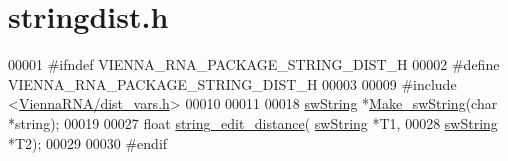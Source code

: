 \hypertarget{stringdist_8h_source}{}\section{stringdist.\+h}
\label{stringdist_8h_source}

\begin{DoxyCode}
00001 \textcolor{preprocessor}{#ifndef VIENNA\_RNA\_PACKAGE\_STRING\_DIST\_H}
00002 \textcolor{preprocessor}{#define VIENNA\_RNA\_PACKAGE\_STRING\_DIST\_H}
00003 
00009 \textcolor{preprocessor}{#include <\hyperlink{dist__vars_8h}{ViennaRNA/dist\_vars.h}>}
00010 
00011 
00018 \hyperlink{structswString}{swString} *\hyperlink{stringdist_8h_a3125991b3a403b3f89230474deb3f22e}{Make\_swString}(\textcolor{keywordtype}{char} *\textcolor{keywordtype}{string});
00019 
00027 \textcolor{keywordtype}{float}     \hyperlink{stringdist_8h_a89e3c335ef17780576d7c0e713830db9}{string\_edit\_distance}( \hyperlink{structswString}{swString} *T1,
00028                                 \hyperlink{structswString}{swString} *T2);
00029 
00030 \textcolor{preprocessor}{#endif}
\end{DoxyCode}

